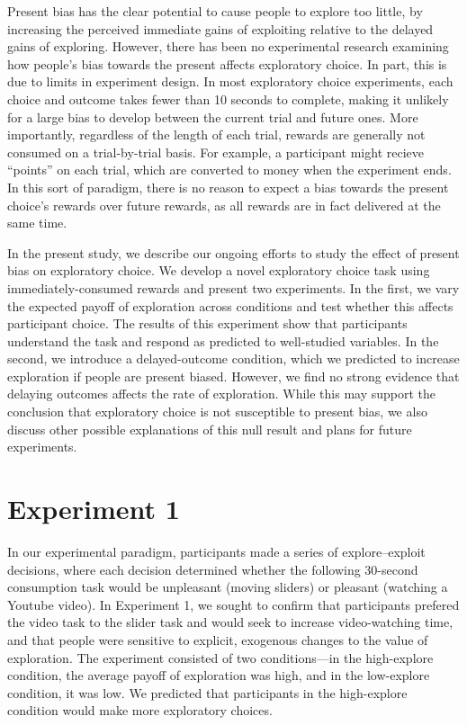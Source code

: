 \documentclass[10pt,letterpaper]{article}
\begin{document}
Present bias has the clear potential to cause people to explore too little, by
increasing the perceived immediate gains of exploiting relative to the delayed
gains of exploring. However, there has been no experimental research
examining how people's bias towards the present affects exploratory choice. In
part, this is due to limits in experiment design. In most exploratory
choice experiments, each choice and outcome takes fewer than 10 seconds to
complete, making it unlikely for a large bias to develop between the current
trial and future ones. More importantly, regardless of the length of each trial,
rewards are generally not consumed on a trial-by-trial basis. For example, a participant
might recieve ``points'' on each trial, which are converted to money when the
experiment ends. In this sort of paradigm, there is no reason to expect a bias
towards the present choice's rewards over future rewards, as all rewards are
in fact delivered at the same time.

In the present study, we describe our ongoing efforts to study the effect of present bias
on exploratory choice. We develop a novel exploratory choice task using
immediately-consumed rewards and present two experiments. In the first, we vary
the expected payoff of exploration across conditions and test whether this affects
participant choice. The results of this experiment show that participants understand the task and respond
as predicted to well-studied variables. In the second, we introduce a
delayed-outcome condition, which we predicted to increase exploration
if people are present biased. However, we find no strong evidence that delaying outcomes affects
the rate of exploration. While this may support the conclusion that exploratory
choice is not susceptible to present bias, we also discuss other possible
explanations of this null result and plans for future experiments.

\section{Experiment 1}

In our experimental paradigm, participants made a series of explore--exploit
decisions, where each decision determined whether the following 30-second
consumption task would be unpleasant (moving sliders) or pleasant (watching a
Youtube video). In Experiment 1, we sought to confirm that participants prefered
the video task to the slider task and would seek to increase video-watching
time, and that people were sensitive to explicit, exogenous changes to the value
of exploration. The experiment consisted of two conditions---in the high-explore
condition, the average payoff of exploration was high, and in the low-explore
condition, it was low. We predicted that participants in the high-explore condition
would make more exploratory choices.
\end{document}
